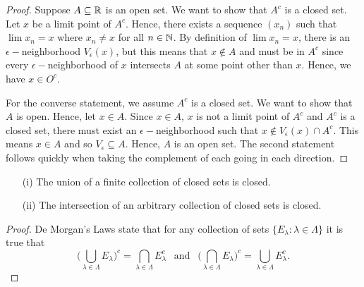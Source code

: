 \begin{proof}
    Suppose \( A \subseteq \mathbb{R}  \) is an open set. We want to show that \( A^c \) is a closed set. Let \( x  \) be a limit point of \( A^c \). Hence, there exists a sequence \( (x_n) \) such that \( \lim x_n = x \) where \( x_n \neq x  \) for all \( n \in \mathbb{N}  \). By definition of \( \lim x_n = x  \), there is an \( \epsilon- \)neighborhood \( V_{\epsilon } (x) \), but this means that \( x \notin A \) and must be in \( A^c \) since every \( \epsilon - \)neighborhood of \( x \) intersects \( A \) at some point other than \( x \). Hence, we have \( x \in O^c \). 
    
    For the converse statement, we assume \( A^c \) is a closed set. We want to show that \( A \) is open. Hence, let \( x \in A \). Since \( x \in A \), \( x \) is not a limit point of \( A^c \) and \( A^c \) is a closed set, there must exist an \( \epsilon - \)neighborhood such that \( x \notin V_{\epsilon }(x) \cap A^c \). This means \( x \in A \) and so \( V_{\epsilon } \subseteq A \). Hence, \( A \) is an open set.  
    The second statement follows quickly when taking the complement of each going in each direction.
\end{proof}

\begin{theorem}{}{}
\begin{enumerate}
    \item[(i)] The union of a finite collection of closed sets is closed. 
    \item[(ii)] The intersection of an arbitrary collection of closed sets is closed. 
\end{enumerate}
\end{theorem}

\begin{proof}
    De Morgan's Laws state that for any collection of sets \( \{ E_{\lambda} : \lambda \in \Lambda \}  \) it is true that 
    \[ \Big( \bigcup_{\lambda \in \Lambda} E_{\lambda}\Big)^c = \bigcap_{\lambda \in \Lambda} E_{\lambda}^c ~~ \text{ and } ~~ \Big( \bigcap_{\lambda \in \Lambda} E_{\lambda}\Big)^c = \bigcup_{\lambda \in \Lambda} E_{\lambda}^c. \]
\end{proof}


